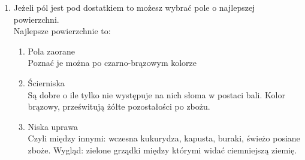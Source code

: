 \documentclass{article}
\begin{document}
\begin{enumerate}
\item Jeżeli pól jest pod dostatkiem to możesz wybrać pole o najlepszej
    powierzchni. \\
    Najlepsze powierzchnie to:
    \begin{enumerate}
        \item Pola zaorane \\
            Poznać je można po czarno-brązowym kolorze
        \item Ścierniska \\
            Są dobre o ile tylko nie występuje na nich słoma w postaci bali.
            Kolor brązowy, prześwitują żółte pozostałości po zbożu.
        \item Niska uprawa \\
            Czyli między innymi: wczesna kukurydza, kapusta, buraki, świeżo
            posiane zboże. Wygląd: zielone grządki między którymi
            widać ciemniejszą ziemię.
    \end{enumerate}
\end{enumerate}
\end{document}
